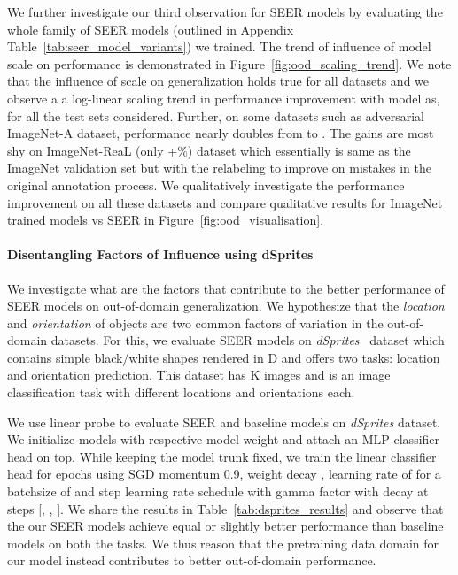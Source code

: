 \documentclass[10pt,twocolumn,letterpaper]{article}
\begin{document}
We further investigate our third observation for SEER models by evaluating the whole family of SEER models (outlined in Appendix Table~\ref{tab:seer_model_variants}) we trained. The trend of influence of model scale on performance is demonstrated in Figure~\ref{fig:ood_scaling_trend}. We note that the influence of scale on generalization holds true for all datasets and we observe a a log-linear scaling trend in performance improvement with model as, for all the test sets considered. Further, on some datasets such as adversarial ImageNet-A dataset, performance nearly doubles from  to .
The gains are most shy on ImageNet-ReaL (only +\%) dataset which essentially is same as the ImageNet validation set but with the relabeling to improve on mistakes in the original annotation process. We qualitatively investigate the performance improvement on all these datasets and compare qualitative results for ImageNet trained models vs SEER in Figure~\ref{fig:ood_visualisation}.





\paragraph{Disentangling Factors of Influence using dSprites}
We investigate what are the factors that contribute to the better performance of SEER models on out-of-domain generalization. We hypothesize that the \textit{location} and \textit{orientation} of objects are two common factors of variation in the out-of-domain datasets. For this, we evaluate SEER models on \textit{dSprites}~\cite{dsprites17} dataset which contains simple black/white shapes rendered in D and offers two tasks: location and orientation prediction. This dataset has K images and is an image classification task with  different locations and orientations each.

We use linear probe to evaluate SEER and baseline models on \textit{dSprites} dataset. We initialize models with respective model weight and attach an MLP classifier head on top. While keeping the model trunk fixed, we train the linear classifier head for  epochs using SGD momentum 0.9, weight decay , learning rate of  for a batchsize of  and step learning rate schedule with gamma factor  with decay at steps [, , ]. We share the results in Table~\ref{tab:dsprites_results} and observe that the our SEER models achieve equal or slightly better performance than baseline models on both the tasks. We thus reason that the pretraining data domain for our model instead contributes to better out-of-domain performance. 
\end{document}
